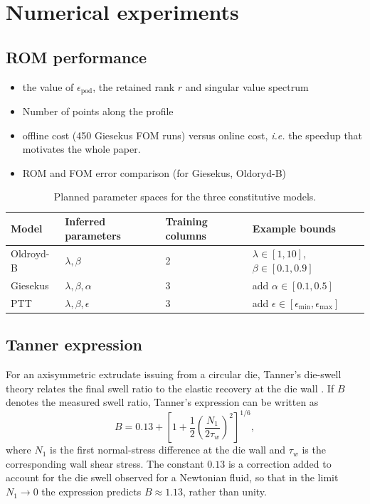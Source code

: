 \documentclass{elsarticle}
\newcommand{\ie}{\emph{i.e.}\xspace}
\begin{document}
\FloatBarrier
\section{Numerical experiments}
\label{sec:numerical_experiments}

\subsection{ROM performance}
\begin{itemize}
\item the value of $\epsilon_{\text{pod}}$, the retained rank $r$ and singular value spectrum
\item Number of points along the profile
\item offline cost (450 Giesekus FOM runs) versus online cost, \ie the speedup that motivates the whole paper.
\item  ROM and FOM error comparison (for Giesekus, Oldoryd-B)

\end{itemize}

\begin{table}[!ht]
  \centering
  \caption{Planned parameter spaces for the three constitutive models.}
  \label{tab:parameter-spaces}
  \begin{tabular}{llll}
    \toprule
    Model & Inferred parameters & Training columns & Example bounds \\
    \midrule
    Oldroyd-B & $\lambda,\beta$ & 2 & $\lambda\in[1,10]$, $\beta\in[0.1,0.9]$ \\
    Giesekus & $\lambda,\beta,\alpha$ & 3 & add $\alpha\in[0.1,0.5]$ \\
    PTT & $\lambda,\beta,\epsilon$ & 3 & add $\epsilon\in[\epsilon_{\min},\epsilon_{\max}]$ \\
    \bottomrule
  \end{tabular}
\end{table}
\subsection{Tanner expression}

For an axisymmetric extrudate issuing from a circular die, Tanner's
die-swell theory relates the final swell ratio to the elastic recovery at
the die wall \cite{Tanner1970}. If \(B\) denotes the measured swell ratio,
Tanner's expression can be written as
\begin{equation}
    B
    =
    0.13
    +
    \left[
        1
        +
        \frac{1}{2}
        \left(
            \frac{N_{1}}{2\tau_w}
        \right)^2
    \right]^{1/6},
    \label{eq:tanner_swell}
\end{equation}
where \(N_{1}\) is the first normal-stress difference at the die wall and
\(\tau_w\) is the corresponding wall shear stress. The constant
\(0.13\) is a correction added to account for the
die swell observed for a Newtonian fluid, so that in the limit
\(N_{1}\rightarrow 0\) the expression predicts \(B \approx 1.13\), rather
than unity.
\end{document}
